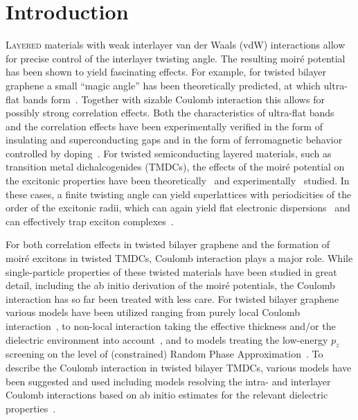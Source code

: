 \clearpage


\section{Introduction}

\lettrine[lines=3]{L}{ayered} materials with weak interlayer van der Waals (vdW) interactions allow for precise control of the interlayer twisting angle. The resulting moir\'e potential has been shown to yield fascinating effects. For example, for twisted bilayer graphene a small ``magic angle'' has been theoretically predicted, at which ultra-flat bands form~\cite{suarez_morell_flat_2010,bistritzer_moire_2011}. Together with sizable Coulomb interaction this allows for possibly strong correlation effects. Both the characteristics of ultra-flat bands~\cite{li_observation_2010} and the correlation effects have been experimentally verified in the form of insulating and superconducting gaps and in the form of ferromagnetic behavior controlled by doping~\cite{cao_correlated_2018,cao_unconventional_2018,yankowitz_tuning_2019,sharpe_emergent_2019}. For twisted semiconducting layered materials, such as transition metal dichalcogenides (TMDCs), the effects of the moir\'e potential on the excitonic properties have been theoretically~\cite{wu_topological_2017,danovich_localized_2018,wu_hubbard_2018,brem_tunable_2020,choi_twist_2021} and experimentally~\cite{tran_evidence_2019,seyler_signatures_2019,zhang_twist-angle_2020} studied. In these cases, a finite twisting angle can yield superlattices with periodicities of the order of the excitonic radii, which can again yield flat electronic dispersions~\cite{li_imaging_2021,angeli__2021} and can effectively trap exciton complexes~\cite{seyler_signatures_2019,brem_tunable_2020}. 

For both correlation effects in twisted bilayer graphene and the formation of moir\'e excitons in twisted TMDCs, Coulomb interaction plays a major role. While single-particle properties of these twisted materials have been studied in great detail, including the ab initio derivation of the moir\'e potentials, the Coulomb interaction has so far been treated with less care.  For twisted bilayer graphene various models have been utilized ranging from purely local Coulomb interaction~\cite{cao_correlated_2018}, to non-local interaction taking the effective thickness and/or the dielectric environment into account~\cite{goodwin_twist-angle_2019,cea_band_2020,bernevig_twisted_2021,liu_tuning_2021}, and to models treating the low-energy $p_z$ screening on the level of (constrained) Random Phase Approximation~\cite{pizarro_internal_2019,goodwin_attractive_2019}. To describe the Coulomb interaction in twisted bilayer TMDCs, various models have been suggested and used including models resolving the intra- and interlayer Coulomb interactions based on ab initio estimates for the relevant dielectric properties~\cite{danovich_localized_2018,brem_tunable_2020,choi_twist_2021}.


